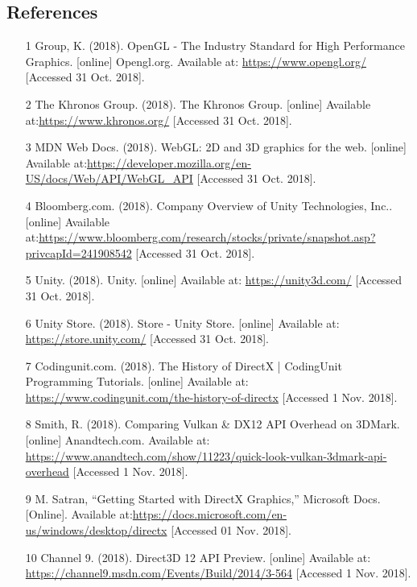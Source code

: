 \documentclass[onecolumn, draftclsnofoot,10pt, compsoc]{IEEEtran}
\begin{document}
\subsection{References}
\begin{enumerate}
\item [1] Group, K. (2018). OpenGL - The Industry Standard for High Performance Graphics. [online] Opengl.org. Available at: \url{https://www.opengl.org/} [Accessed 31 Oct. 2018].
\item [2] The Khronos Group. (2018). The Khronos Group. [online] Available at:\url{https://www.khronos.org/} [Accessed 31 Oct. 2018].
\item [3] MDN Web Docs. (2018). WebGL: 2D and 3D graphics for the web. [online] Available at:\url{https://developer.mozilla.org/en-US/docs/Web/API/WebGL_API} [Accessed 31 Oct. 2018].
\item [4] Bloomberg.com. (2018). Company Overview of Unity Technologies, Inc.. [online] Available at:\url{https://www.bloomberg.com/research/stocks/private/snapshot.asp?privcapId=241908542} [Accessed 31 Oct. 2018].
\item [5] Unity. (2018). Unity. [online] Available at: \url{https://unity3d.com/} [Accessed 31 Oct. 2018].
\item [6]Unity Store. (2018). Store - Unity Store. [online] Available at: \url{https://store.unity.com/} [Accessed 31 Oct. 2018].

\item [7]	Codingunit.com. (2018). The History of DirectX | CodingUnit Programming Tutorials. [online] Available at: \url{https://www.codingunit.com/the-history-of-directx} [Accessed 1 Nov. 2018].
\item [8]	Smith, R. (2018). Comparing Vulkan \& DX12 API Overhead on 3DMark. [online] Anandtech.com. Available at: \url{https://www.anandtech.com/show/11223/quick-look-vulkan-3dmark-api-overhead} [Accessed 1 Nov. 2018].
\item [9]	M. Satran, “Getting Started with DirectX Graphics,” Microsoft Docs. [Online]. Available at:\url{https://docs.microsoft.com/en-us/windows/desktop/directx} [Accessed 01 Nov. 2018].
\item [10]	Channel 9. (2018). Direct3D 12 API Preview. [online] Available at:
\url{https://channel9.msdn.com/Events/Build/2014/3-564} [Accessed 1 Nov. 2018].

\end{enumerate}

\end{document}
